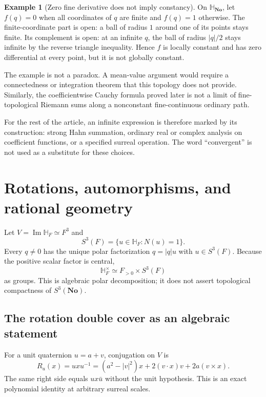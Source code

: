 \documentclass[11pt,letterpaper]{article}
\numberwithin{equation}{section}
\theoremstyle{definition}
\newtheorem{example}[example]{Example}
\theoremstyle{remark}
\newcommand{\No}{\mathbf{No}}
\newcommand{\SQ}{\mathbb H_{\No}}
\newcommand{\HF}{\mathbb H_F}
\newcommand{\Ima}{\operatorname{Im}}
\begin{document}
\begin{example}[Zero fine derivative does not imply constancy]\label{ex:zeroderivative}
On $\SQ$, let $f(q)=0$ when all coordinates of $q$ are finite and $f(q)=1$ otherwise.
The finite-coordinate part is open: a ball of radius $1$ around one of its points stays
finite. Its complement is open: at an infinite $q$, the ball of radius $|q|/2$ stays infinite
by the reverse triangle inequality. Hence $f$ is locally constant and has zero differential
at every point, but it is not globally constant.
\end{example}

The example is not a paradox. A mean-value argument would require a connectedness or
integration theorem that this topology does not provide. Similarly, the coefficientwise
Cauchy formula proved later is not a limit of fine-topological Riemann sums along a
nonconstant fine-continuous ordinary path.

For the rest of the article, an infinite expression is therefore marked by its construction:
strong Hahn summation, ordinary real or complex analysis on coefficient functions, or a
specified surreal operation. The word ``convergent'' is not used as a substitute for these
choices.

\section{Rotations, automorphisms, and rational geometry}\label{sec:geometry}

Let $V=\Ima\HF\simeq F^3$ and
\[
 S^3(F)=\{u\in\HF:N(u)=1\}.
\]
Every $q\ne0$ has the unique polar factorization $q=|q|u$ with $u\in S^3(F)$. Because the
positive scalar factor is central,
\begin{equation}\label{eq:polargroup}
 \HF^\times\simeq F_{>0}\times S^3(F)
\end{equation}
as groups. This is algebraic polar decomposition; it does not assert topological compactness
of $S^3(\No)$.

\subsection{The rotation double cover as an algebraic statement}
For a unit quaternion $u=a+v$, conjugation on $V$ is
\begin{equation}\label{eq:rodrigues}
 R_u(x)=uxu^{-1}
 =(a^2-|v|^2)x+2(v\cdot x)v+2a(v\times x).
\end{equation}
The same right side equals $ux\bar u$ without the unit hypothesis. This is an exact polynomial
identity at arbitrary surreal scales.
\end{document}
